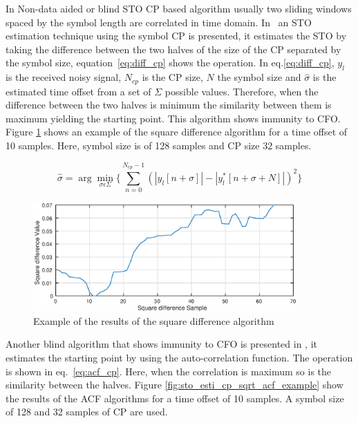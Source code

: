 In Non-data aided or blind STO CP based algorithm usually two sliding windows spaced by the symbol length are correlated in time domain. In~\cite{cho2010mimo} an STO estimation technique using the symbol CP is presented, it estimates the STO by taking the difference between the two halves of the size of the CP separated by the symbol size, equation~\ref{eq:diff_cp} shows the operation. In eq.\ref{eq:diff_cp}, $y_{l}$ is the received noisy signal, $N_{cp}$ is the CP size, $N$ the symbol size and $\hat{\sigma}$ is the estimated time offset from a set of $\Sigma$ possible values. Therefore, when the difference between the two halves is minimum the similarity between them is maximum yielding the starting point. This algorithm shows immunity to CFO. Figure \ref{fig:sto_esti_cp_sqrt_diff_example} shows an example of the square difference algorithm for a time offset of 10 samples. Here, symbol size is of 128 samples and CP size 32 samples. 

 \begin{equation} 
\hat{\sigma} = \arg\min\limits_{\sigma \epsilon \Sigma} \{ \sum\limits_{n=0}^{N_{cp}-1} (| y_l[n+\sigma] |  - |y_{l}^{*}[n+\sigma+N]|)^2  \}
    \label{eq:diff_cp} 
\end{equation}

\begin{figure}[hbt]
  \centering
    \includegraphics[width=0.9\textwidth]
      {./figures/time_estimation_example_cps_diff}
  \caption{Example of the results of the square difference algorithm}
  \label{fig:sto_esti_cp_sqrt_diff_example}
\end{figure}

Another blind algorithm that shows immunity to CFO is presented in \cite{doc_thesys_sync}, it estimates the starting point by using the auto-correlation function. The operation is shown in eq.~\ref{eq:acf_cp}. Here, when the correlation is maximum so is the similarity between the halves. Figure \ref{fig:sto_esti_cp_sqrt_acf_example} show the results of the ACF algorithms for a time offset of 10 samples. A symbol size of 128 and 32 samples of CP are used.   

